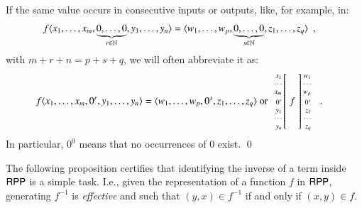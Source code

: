 \begin{notation}
If the same value occurs in consecutive inputs or outputs, like, for example, in:
\begin{align*}
f\langle x_1, \ldots, x_m, \underbrace{0, \ldots, 0}_{r\in\mathbb{N}}, y_1,\ldots, y_n \rangle
 & = \langle w_1, \ldots, w_p, \underbrace{0, \ldots, 0}_{s\in\mathbb{N}}, z_1,\ldots, z_q \rangle
\enspace ,
\end{align*}
with $ m+r+n = p+s+q $, we will often abbreviate it as:
\begin{align*}
f\langle x_1, \ldots, x_m, 0^r, y_1,\ldots, y_n \rangle
 & = \langle w_1, \ldots, w_p, 0^s, z_1,\ldots, z_q \rangle
\textrm{ or  }
\arraycolsep=1.4pt
\begin{array}{rcl}
 \left. {\scriptsize 
            \begin{array}{r}
             x_1 \\ \cdots \\ x_m \\[1mm] 0^r \\ y_1 \\ \cdots \\ y_n
            \end{array} 
         } \right[
 & f &
 \left] {\scriptsize 
            \begin{array}{r}
             w_1 \\ \cdots \\ w_p \\[1mm] 0^s \\ z_1 \\ \cdots \\ z_q
            \end{array} 
        } \right.
\end{array}
\enspace .
\end{align*}
In particular, $ 0^0 $ means that no occurrences of $ 0 $ exist. 
\qed
\end{notation}

The following proposition certifies that identifying the inverse of a term inside $ \mathsf{RPP} $ 
is a simple task. I.e., given the representation of a
function $ f $ in $ \mathsf{RPP} $,  generating $ f^{-1} $ is \emph{effective} and 
such that $(y,x)\in f^{-1}$ if and only if $(x,y)\in f$.


